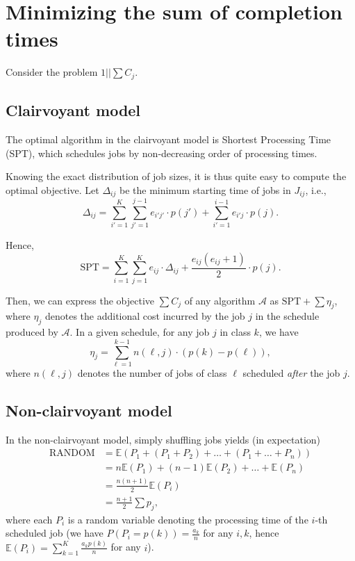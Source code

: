\documentclass{article}
\begin{document}

\section{Minimizing the sum of completion times}

Consider the problem \(1||\sum C_j\).

\subsection{Clairvoyant model}

The optimal algorithm in the clairvoyant model is Shortest Processing Time (SPT), which schedules jobs by non-decreasing order of processing times.

Knowing the exact distribution of job sizes, it is thus quite easy to compute the optimal objective.
Let \(\Delta_{ij}\) be the minimum starting time of jobs in \(J_{ij}\), i.e.,
\[
    \Delta_{ij}=\sum_{i'=1}^{K} \sum_{j'=1}^{j-1} e_{i'j'} \cdot p(j') + \sum_{i'=1}^{i-1} e_{i'j} \cdot p(j).
\]

Hence,
\[
    \text{SPT}=\sum_{i=1}^{K} \sum_{j=1}^{K} e_{ij} \cdot \Delta_{ij} + \frac{e_{ij}(e_{ij}+1)}{2} \cdot p(j).
\]

Then, we can express the objective \(\sum C_j\) of any algorithm \(\mathcal{A}\) as \(\text{SPT}+\sum \eta_j\),
where \(\eta_j\) denotes the additional cost incurred by the job \(j\) in the schedule produced by \(\mathcal{A}\).
In a given schedule, for any job \(j\) in class \(k\), we have
\[
    \eta_j=\sum_{\ell=1}^{k-1} n(\ell,j)\cdot (p(k)-p(\ell)),
\]
where \(n(\ell,j)\) denotes the number of jobs of class \(\ell\) scheduled \emph{after} the job \(j\).

\subsection{Non-clairvoyant model}

In the non-clairvoyant model, simply shuffling jobs yields (in expectation)
\begin{align*}
    \text{RANDOM}&=\mathbb{E}(P_1+(P_1+P_2)+\dots+(P_1+\dots+P_n)) \\
    &=n\mathbb{E}(P_1)+(n-1)\mathbb{E}(P_2)+\dots+\mathbb{E}(P_n) \\
    &=\frac{n(n+1)}{2}\mathbb{E}(P_i) \\
    &=\frac{n+1}{2}\sum p_j,
\end{align*}
where each \(P_i\) is a random variable denoting the processing time of the \(i\)-th scheduled job (we have
\(P(P_i=p(k))=\frac{a_k}{n}\) for any \(i,k\), hence \(\mathbb{E}(P_i)=\sum_{k=1}^{K} \frac{a_k p(k)}{n}\) for any \(i\)).
\end{document}
